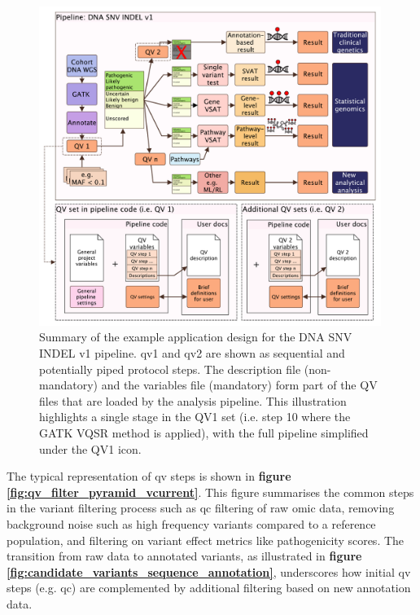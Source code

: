 \begin{figure}[!h]
    \centering
   \includegraphics[width=0.99\textwidth]{./images/qv_pipeline_with_file_vcurrent.pdf}
    \caption{Summary of the example application design for the DNA SNV INDEL v1 pipeline. \ac{qv}1 and \ac{qv}2 are shown as sequential and potentially piped protocol steps. The description file (non-mandatory) and the variables file (mandatory) form part of the QV files that are loaded by the analysis pipeline. This illustration highlights a single stage in the QV1 set (i.e. step 10 where the GATK VQSR method is applied), with the full pipeline simplified under the QV1 icon.}
    \label{fig:qv_pipeline_with_file_vcurrent}
\end{figure}

The typical representation of \ac{qv} steps is shown in \textbf{figure \ref{fig:qv_filter_pyramid_vcurrent}}.
This figure summarises the common steps in the variant filtering process such as \ac{qc} filtering of raw omic data,
removing background noise such as high frequency variants compared to a reference population, and filtering on variant effect metrics like pathogenicity scores.
The transition from raw data to annotated variants, as illustrated in \textbf{figure \ref{fig:candidate_variants_sequence_annotation}}, underscores how initial \ac{qv} steps (e.g. \ac{qc}) are complemented by additional filtering based on new annotation data.
 
